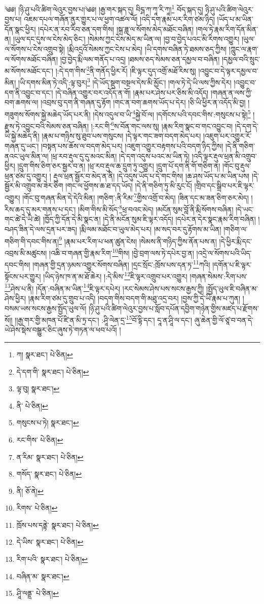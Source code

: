 \setcounter{footnote}{0} 
༄༅། །ཉི་ཤུ་པའི་ཚིག་ལེའུར་བྱས་པ།༄༅། །རྒྱ་གར་སྐད་དུ། བིངྴ་ཀ་ཀཱ་རི་ཀཱ།\footnote{ཀ།  སྣར་ཐང་།  པེ་ཅིན། } བོད་སྐད་དུ། ཉི་ཤུ་པའི་ཚིག་ལེའུར་བྱས་པ། འཇམ་དཔལ་གཞོན་ནུར་གྱུར་པ་ལ་ཕྱག་འཚལ་ལོ། །འདི་དག་རྣམ་པར་རིག་ཙམ་ཉིད། །ཡོད་པ་མ་ཡིན་དོན་སྣང་ཕྱིར། །དཔེར་ན་རབ་རིབ་ཅན་དག་གིས། །སྐྲ་ཟླ་ལ་སོགས་མེད་མཐོང་བཞིན། །གལ་ཏེ་རྣམ་རིག་དོན་མིན་ན། །ཡུལ་དང་དུས་ལ་ངེས་མེད་ཅིང་། །སེམས་ཀྱང་ངེས་མེད་མ་ཡིན་ལ། །བྱ་བ་བྱེད་པའང་མི་རིགས་འགྱུར། །ཡུལ་ལ་སོགས་པ་ངེས་འགྲུབ་སྟེ། །རྨི་འདྲའོ་སེམས་ཀྱང་ངེས་པ་མེད། །ཡི་དགས་བཞིན་ཏེ་ཐམས་ཅད་ཀྱིས། །ཀླུང་ལ་རྣག་ལ་སོགས་མཐོང་བཞིན། །བྱ་བྱེད་རྨི་ལམ་གནོད་པ་འདྲ། །ཐམས་ཅད་སེམས་ཅན་དམྱལ་བ་བཞིན། །དམྱལ་བའི་སྲུང་མ་སོགས་མཐོང་དང་། །:དེ་དག་གིས་\footnote{དེ་དག་གི་  སྣར་ཐང་།  པེ་ཅིན། }ནི་གནོད་ཕྱིར་རོ། །ཇི་ལྟར་དུད་འགྲོ་མཐོ་རིས་སུ། །འབྱུང་བ་དེ་ལྟར་དམྱལ་བ་མིན། །ཡི་དགས་མིན་ཏེ་འདི་:ལྟ་བུར།\footnote{ལྟ་བུ།  སྣར་ཐང་། } །དེ་ཡོད་སྡུག་བསྔལ་དེས་མི་མྱོང་། །གལ་ཏེ་དེ་ཡི་ལས་ཀྱིས་དེར། །འབྱུང་བ་དག་ནི་འབྱུང་བ་དང་། །དེ་བཞིན་འགྱུར་བར་འདོད་ན་གོ། །རྣམ་པར་ཤེས་པར་ཅིས་མི་འདོད། །གཞན་ན་ལས་ཀྱི་བག་ཆགས་ལ། །འབྲས་བུ་དག་ནི་གཞན་དུ་རྟོག །གང་ན་བག་ཆགས་ཡོད་པ་དེར། །ཅི་ཡི་ཕྱིར་ན་འདོད་མི་བྱ། །གཟུགས་སོགས་སྐྱེ་མཆེད་ཡོད་པར་ནི། །དེས་འདུལ་བ་ཡི་\footnote{ནི་  པེ་ཅིན། }སྐྱེ་བོ་ལ། །དགོངས་པའི་དབང་གིས་:གསུངས་པ་སྟེ།\footnote{གསུངས་པ་ཏེ།  སྣར་ཐང་། } །རྫུས་ཏེ་འབྱུང་བའི་སེམས་ཅན་བཞིན། །:རང་གི་\footnote{རང་གིས་  པེ་ཅིན། }ས་བོན་གང་ལས་སུ། །རྣམ་རིག་སྣང་བ་གང་འབྱུང་བ། །དེ་དག་དེ་ཡི་སྐྱེ་མཆེད་ནི། །རྣམ་པ་གཉིས་སུ་ཐུབ་པས་གསུངས། །དེ་ལྟར་གང་ཟག་བདག་མེད་པར། །འཇུག་པར་འགྱུར་རོ་གཞན་དུ་ཡང་། །བསྟན་པས་ཆོས་ལ་བདག་མེད་པར། །འཇུག་འགྱུར་བརྟགས་པའི་བདག་ཉིད་ཀྱིས། །དེ་ནི་གཅིག་ནའང་ཡུལ་མིན་ལ། །ཕྲ་རབ་རྡུལ་དུ་དུ་མའང་མིན། །དེ་དག་འདུས་པའང་མ་ཡིན་ཏེ། །འདི་ལྟར་རྡུལ་ཕྲན་མི་འགྲུབ་ཕྱིར། །དྲུག་གིས་ཅིག་ཅར་སྦྱར་བ་ན། །ཕྲ་རབ་རྡུལ་ཆ་དྲུག་ཏུ་འགྱུར། །དྲུག་པོ་དག་ནི་གོ་གཅིག་ན། །གོང་བུ་རྡུལ་ཕྲན་ཙམ་དུ་འགྱུར། །
རྡུལ་ཕྲན་སྦྱོར་བ་མེད་ན་ནི། །དེ་འདུས་ཡོད་པ་དེ་གང་གིས། །ཆ་ཤས་ཡོད་པ་མ་ཡིན་པས། །དེ་སྦྱོར་མི་འགྲུབ་མ་ཟེར་ཅིག །གང་ལ་ཕྱོགས་ཆ་ཐ་དད་ཡོད། །དེ་ནི་གཅིག་ཏུ་མི་རུང་ངོ། །གྲིབ་དང་སྒྲིབ་པར་ཇི་ལྟར་འགྱུར། །གོང་བུ་གཞན་མིན་དེ་དེའི་མིན། །གཅིག་:ནི་རིམ་\footnote{ན་རིམ་  སྣར་ཐང་།  པེ་ཅིན། }གྱིས་འགྲོ་བ་མེད། །ཟིན་དང་མ་ཟན་ཅིག་ཅར་མེད། །རིས་ཆད་དུ་མར་གནས་པ་དང་། །མིག་གིས་མི་སོད་\footnote{གསོད་  སྣར་ཐང་།  པེ་ཅིན། }ཕྲ་བའང་མེད། །མངོན་སུམ་བློ་ནི་རྨི་སོགས་བཞིན། །དེ་ཡང་གང་ཚེ་དེ་ཡི་ཚེ། །ཁྱོད་ཀྱི་དོན་དེ་མི་སྣང་ན། །དེ་ནི་མངོན་སུམ་ཇི་ལྟར་འདོད། །དཔེར་ན་དེར་སྣང་རྣམ་རིག་བཞིན། །བཤད་ཟིན་དེ་ལས་དྲན་པར་ཟད། །རྨི་ལམ་མཐོང་བ་ཡུལ་མེད་པར། །མ་སད་བར་དུ་རྟོགས་མ་ཡིན། །གཅིག་ལ་གཅིག་གི་དབང་གིས་ན།\footnote{ནི།  ཅོ་ནེ། } །རྣམ་པར་རིག་པ་ཕན་ཚུན་ངེས། །སེམས་ནི་གཉིད་ཀྱིས་ནོན་པས་ན། །དེ་ཕྱིར་རྨི་དང་འབྲས་མི་མཚུངས། །འཆི་བ་གཞན་གྱི་རྣམ་རིག་\footnote{རིགས་  པེ་ཅིན། }གིས། །བྱེ་བྲག་ལས་ཏེ་དཔེར་བྱ་ན། །འདྲེ་ལ་སོགས་པའི་ཡིད་དབང་གིས། །གཞན་གྱི་དྲན་ཉམས་འགྱུར་སོགས་བཞིན། །དྲང་སྲོང་:ཁྲོས་པས་དན་ཏ་\footnote{ཁྲོས་པས་དནྟེ་  སྣར་ཐང་།  པེ་ཅིན། }ཀའི། །དགོན་པ་ཇི་ལྟར་སྟོངས་པར་གྱུར། །ཡིད་ཉེས་ཁ་ན་མ་ཐོ་ཆེར། །:དེ་མིས་\footnote{དེ་ཡིས་  སྣར་ཐང་།  པེ་ཅིན། }ཇི་ལྟར་འགྲུབ་པར་འགྱུར། །གཞན་སེམས་:རིག་པས་\footnote{རིག་པའི་  སྣར་ཐང་།  པེ་ཅིན། }ཤེས་པ་ནི། །དོན་:བཞིན་མ་ཡིན་\footnote{བཞིན་མ་  སྣར་ཐང་། }ཇི་ལྟར་དཔེར། །རང་སེམས་ཤེས་པས་སངས་རྒྱས་ཀྱི། །སྤྱོད་ཡུལ་ཇི་བཞིན་མ་ཤེས་ཕྱིར། །རྣམ་རིག་ཙམ་དུ་གྲུབ་པ་འདི། །བདག་གིས་བདག་གི་མཐུ་འདྲ་བར། །བྱས་ཀྱི་དེ་ཡི་རྣམ་པ་ཀུན། །བསམ་ཡས་སངས་རྒྱས་སྤྱོད་ཡུལ་ལོ། །ཉི་ཤུ་པའི་ཚིག་ལེའུར་བྱས་པ་སློབ་དཔོན་དབྱིག་གཉེན་གྱིས་མཛད་པ་རྫོགས་སོ།། །།རྒྱ་གར་གྱི་མཁན་པོ་ཛི་ན་མི་ཏྲ་དང་། :ཤཱི་ལེན་དྲ་\footnote{ཤཱི་ལནྡྲ་  པེ་ཅིན། }བོ་དྷི་དང་། དཱ་ན་ཤཱི་ལ་དང་། ཞུ་ཆེན་གྱི་ལོ་ཙཱ་བ་བན་དེ་ཡེ་ཤེས་སྡེས་བསྒྱུར་ཅིང་ཞུས་ཏེ་གཏན་ལ་ཕབ་པའོ། །